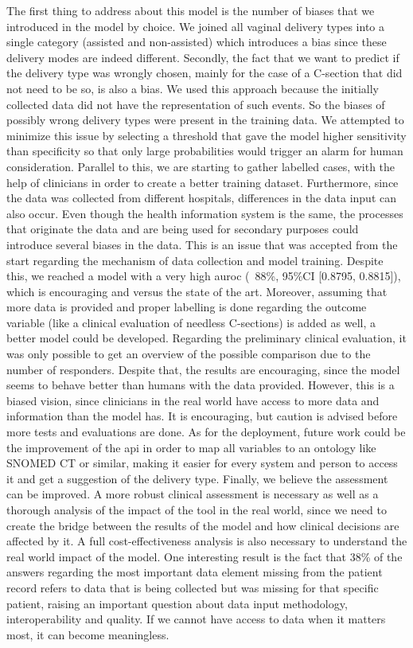 
The first thing to address about this model is the number of biases that we introduced in the model by choice. We joined all vaginal delivery types into a single category (assisted and non-assisted) which introduces a bias since these delivery modes are indeed different. Secondly, the fact that we want to predict if the delivery type was wrongly chosen, mainly for the case of a C-section that did not need to be so, is also a bias. We used this approach because the initially collected data did not have the representation of such events. So the biases of possibly wrong delivery types were present in the training data. We attempted to minimize this issue by selecting a threshold that gave the model higher sensitivity than specificity so that only large probabilities would trigger an alarm for human consideration. Parallel to this, we are starting to gather labelled cases, with the help of clinicians in order to create a better training dataset. Furthermore, since the data was collected from different hospitals, differences in the data input can also occur. Even though the health information system is the same, the processes that originate the data and are being used for secondary purposes could introduce several biases in the data. This is an issue that was accepted from the start regarding the mechanism of data collection and model training. Despite this, we reached a model with a very high \ac{auroc} (~88\%, 95\%CI [0.8795, 0.8815]), which is encouraging and versus the state of the art. Moreover, assuming that more data is provided and proper labelling is done regarding the outcome variable (like a clinical evaluation of needless C-sections) is added as well, a better model could be developed. Regarding the preliminary clinical evaluation, it was only possible to get an overview of the possible comparison due to the number of responders. Despite that, the results are encouraging, since the model seems to behave better than humans with the data provided. However, this is a biased vision, since clinicians in the real world have access to more data and information than the model has. It is encouraging, but caution is advised before more tests and evaluations are done. As for the deployment, future work could be the improvement of the \ac{api} in order to map all variables to an ontology like SNOMED CT or similar, making it easier for every system and person to access it and get a suggestion of the delivery type. Finally, we believe the assessment can be improved. A more robust clinical assessment is necessary as well as a thorough analysis of the impact of the tool in the real world, since we need to create the bridge between the results of the model and how clinical decisions are affected by it. A full cost-effectiveness analysis is also necessary to understand the real world impact of the model. One interesting result is the fact that 38\% of the answers regarding the most important data element missing from the patient record refers to data that is being collected but was missing for that specific patient, raising an important question about data input methodology, interoperability and quality. If we cannot have access to data when it matters most, it can become meaningless. 